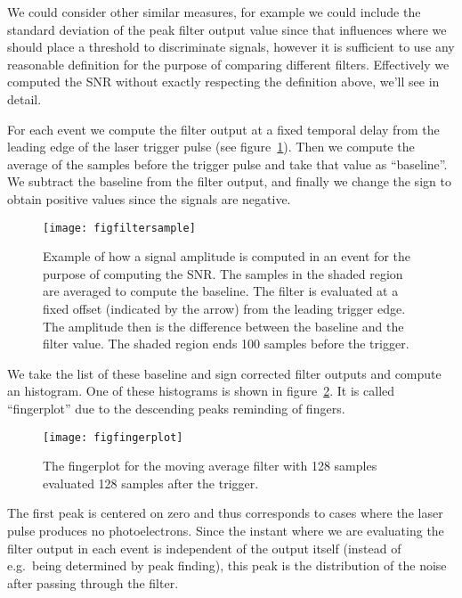 We could consider other similar measures, for example we could include the
standard deviation of the peak filter output value since that influences where
we should place a threshold to discriminate signals, however it is sufficient
to use any reasonable definition for the purpose of comparing different
filters. Effectively we computed the SNR without exactly respecting the
definition above, we'll see in detail.

For each event we compute the filter output at a fixed temporal delay from the
leading edge of the laser trigger pulse (see figure~\ref{fig:filtersample}).
Then we compute the average of the samples before the trigger pulse and take
that value as ``baseline''. We subtract the baseline from the filter output,
and finally we change the sign to obtain positive values since the signals are
negative.

\begin{figure}
    \hspace{-0.25\textwidth}
    \texttt{[image: figfiltersample]}
    
    \caption{Example of how a signal amplitude is computed in an event for the
    purpose of computing the SNR. The samples in the shaded region are averaged
    to compute the baseline. The filter is evaluated at a fixed offset
    (indicated by the arrow) from the leading trigger edge. The amplitude then
    is the difference between the baseline and the filter value. The shaded
    region ends 100 samples before the trigger.}
    
    \label{fig:filtersample}
\end{figure}

We take the list of these baseline and sign corrected filter outputs and
compute an histogram. One of these histograms is shown in
figure~\ref{fig:fingerplot}. It is called ``fingerplot'' due to the descending
peaks reminding of fingers.

\begin{figure}
    \hspace{0.00\textwidth}
    \texttt{[image: figfingerplot]}
    
    \caption{The fingerplot for the moving average filter with 128 samples
    evaluated 128 samples after the trigger.}
    
    \label{fig:fingerplot}
\end{figure}

The first peak is centered on zero and thus corresponds to cases where the
laser pulse produces no photoelectrons. Since the instant where we are
evaluating the filter output in each event is independent of the output itself
(instead of e.g.\ being determined by peak finding), this peak is the
distribution of the noise after passing through the filter.

